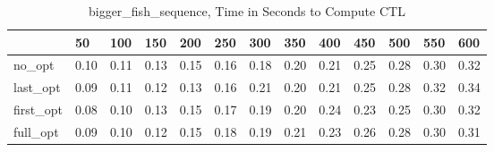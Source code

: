 \begin{table}
\caption{bigger\_fish\_sequence, Time in Seconds to Compute CTL}
\label{bigger_fish_sequence_CTL_time}
\begin{tabular}{lllllllllllll}
\toprule
 & 50 & 100 & 150 & 200 & 250 & 300 & 350 & 400 & 450 & 500 & 550 & 600 \\
\midrule
no\_opt & 0.10 & 0.11 & 0.13 & 0.15 & 0.16 & 0.18 & 0.20 & 0.21 & 0.25 & 0.28 & 0.30 & 0.32 \\
last\_opt & 0.09 & 0.11 & 0.12 & 0.13 & 0.16 & 0.21 & 0.20 & 0.21 & 0.25 & 0.28 & 0.32 & 0.34 \\
first\_opt & 0.08 & 0.10 & 0.13 & 0.15 & 0.17 & 0.19 & 0.20 & 0.24 & 0.23 & 0.25 & 0.30 & 0.32 \\
full\_opt & 0.09 & 0.10 & 0.12 & 0.15 & 0.18 & 0.19 & 0.21 & 0.23 & 0.26 & 0.28 & 0.30 & 0.31 \\
\bottomrule
\end{tabular}
\end{table}
